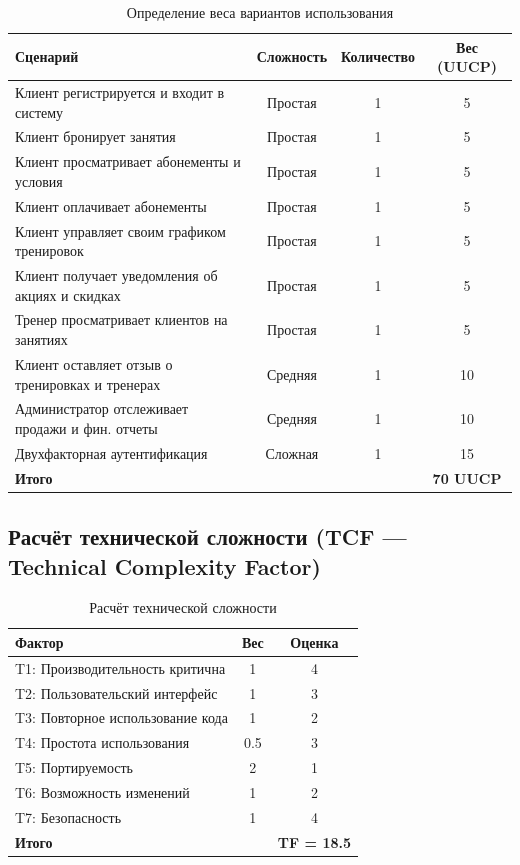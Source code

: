 \documentclass[14pt, russian]{matmex-diploma-custom}
\begin{document}
\begin{table}[H]
    \centering
    \begin{tabular}{|p{7cm}|c|c|c|}
        \hline
        \textbf{Сценарий} & \textbf{Сложность} & \textbf{Количество} & \textbf{Вес (UUCP)} \\
        \hline
        Клиент регистрируется и входит в систему & Простая & 1 & 5 \\
        Клиент бронирует занятия & Простая & 1 & 5 \\
        Клиент просматривает абонементы и условия & Простая & 1 & 5 \\
        Клиент оплачивает абонементы & Простая & 1 & 5 \\
        Клиент управляет своим графиком тренировок & Простая & 1 & 5 \\
        Клиент получает уведомления об акциях и скидках & Простая & 1 & 5 \\
        Тренер просматривает клиентов на занятиях & Простая & 1 & 5 \\
        \hline
        Клиент оставляет отзыв о тренировках и тренерах & Средняя & 1 & 10 \\
        Администратор отслеживает продажи и фин. отчеты & Средняя & 1 & 10 \\
        \hline
        Двухфакторная аутентификация & Сложная & 1 & 15 \\
        \hline
        \textbf{Итого} & & & \textbf{70 UUCP} \\
        \hline
    \end{tabular}
    \caption{Определение веса вариантов использования}
\end{table}


\subsection{Расчёт технической сложности (TCF — Technical Complexity Factor)}

\begin{table}[H]
    \centering
    \begin{tabular}{|p{6.5cm}|c|c|}
    \hline
    Фактор & Вес & Оценка \\
    \hline
    T1: Производительность критична & 1 & 4 \\
    T2: Пользовательский интерфейс & 1 & 3 \\
    T3: Повторное использование кода & 1 & 2 \\
    T4: Простота использования & 0.5 & 3 \\
    T5: Портируемость & 2 & 1 \\
    T6: Возможность изменений & 1 & 2 \\
    T7: Безопасность & 1 & 4 \\    \hline
    \textbf{Итого} & & \textbf{TF = 18.5} \\
    \hline
    \end{tabular}
    \caption{Расчёт технической сложности}
\end{table}
\end{document}
